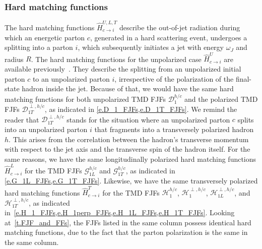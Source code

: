 \documentclass[a4paper, 11 pt]{article}
\begin{document}
\subsubsection{Hard matching functions}
The hard matching functions $\hat{H}_{c \to i}^{U,L,T}$ describe the out-of-jet radiation during which an energetic parton $c$, generated in a hard scattering event, undergoes a splitting into a parton $i$, which subsequently initiates a jet with energy $\omega _J$ and radius $R$. The hard matching functions for the unpolarized case $\hat{H}_{c \to i}^{U}$ are available previously~\cite{Kang:2016ehg, Kang:2016mcy, Kang:2017mda, Cal:2019hjc}. They describe the splitting from an unpolarized initial parton $c$ to an unpolarized parton $i$, irrespective of the polarization of the final-state hadron inside the jet. Because of that, we would have the same hard matching functions for both unpolarized TMD FJFs $\mathcal{D}_{1}^{h/c}$ and the polarized TMD FJFs $\mathcal{D}_{1T}^{\perp, h/c}$, as indicated in \cref{e.D_1_FJFs,e.D_1T_FJFs}.
We remind the reader that $\mathcal{D}_{1T}^{\perp, h/c}$ stands for the situation where an unpolarized parton $c$ splits into an unpolarized parton $i$ that fragments into a transversely polarized hadron $h$. This arises from the correlation between the hadron's transverse momentum with respect to the jet axis and the transverse spin of the hadron itself. For the same reasons, we have the same longitudinally polarized hard matching functions $\hat{H}_{c \to i}^{L}$ for the TMD FJFs $\mathcal{G}_{1L}^{h/c}$ and $\mathcal{G}_{1T}^{h/c}$, as indicated in \cref{e.G_1L_FJFs,e.G_1T_FJFs}.
Likewise, we have the same transversely polarized hard matching functions $\hat{H}_{c \to i}^{T}$ for the TMD FJFs $\mathcal{H}_{1}^{h/c}$, $\mathcal{H}_{1}^{\perp, h/c}$, $\mathcal{H}_{1L}^{\perp, h/c}$, and $\mathcal{H}_{1T}^{\perp, h/c}$, as indicated in~\cref{e.H_1_FJFs,e.H_1perp_FJFs,e.H_1L_FJFs,e.H_1T_FJFs}. Looking at~\cref{t.FJF_and_FFs}, the FJFs listed in the same column possess identical hard matching functions, due to the fact that the parton polarization is the same in the same column. 
\end{document}
